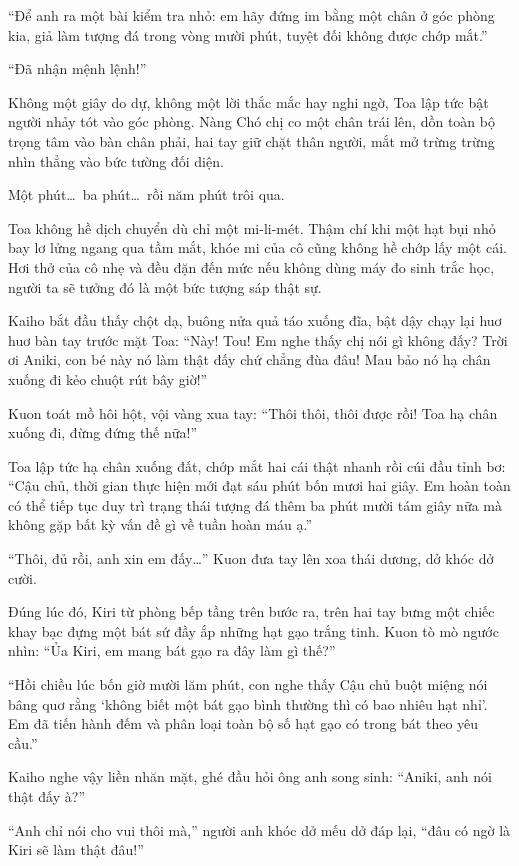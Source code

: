 \documentclass[../main.tex]{subfiles}
\begin{document}
``Để anh ra một bài kiểm tra nhỏ: em hãy đứng im bằng một chân ở góc phòng kia, giả làm tượng đá trong vòng mười phút, tuyệt đối không được chớp mắt.''

``Đã nhận mệnh lệnh!''

Không một giây do dự, không một lời thắc mắc hay nghi ngờ, Toa lập tức bật người nhảy tót vào góc phòng. Nàng Chó chị co một chân trái lên, dồn toàn bộ trọng tâm vào bàn chân phải, hai tay giữ chặt thân người, mắt mở trừng trừng nhìn thẳng vào bức tường đối diện.

Một phút\dots\ ba phút\dots\ rồi năm phút trôi qua.

Toa không hề dịch chuyển dù chỉ một mi-li-mét. Thậm chí khi một hạt bụi nhỏ bay lơ lửng ngang qua tầm mắt, khóe mi của cô cũng không hề chớp lấy một cái. Hơi thở của cô nhẹ và đều đặn đến mức nếu không dùng máy đo sinh trắc học, người ta sẽ tưởng đó là một bức tượng sáp thật sự.

Kaiho bắt đầu thấy chột dạ, buông nửa quả táo xuống đĩa, bật dậy chạy lại huơ huơ bàn tay trước mặt Toa: ``Này! Tou! Em nghe thấy chị nói gì không đấy? Trời ơi Aniki, con bé này nó làm thật đấy chứ chẳng đùa đâu! Mau bảo nó hạ chân xuống đi kẻo chuột rút bây giờ!''

Kuon toát mồ hôi hột, vội vàng xua tay: ``Thôi thôi, thôi được rồi! Toa hạ chân xuống đi, đừng đứng thế nữa!''

Toa lập tức hạ chân xuống đất, chớp mắt hai cái thật nhanh rồi cúi đầu tỉnh bơ: ``Cậu chủ, thời gian thực hiện mới đạt sáu phút bốn mươi hai giây. Em hoàn toàn có thể tiếp tục duy trì trạng thái tượng đá thêm ba phút mười tám giây nữa mà không gặp bất kỳ vấn đề gì về tuần hoàn máu ạ.''

``Thôi, đủ rồi, anh xin em đấy\dots'' Kuon đưa tay lên xoa thái dương, dở khóc dở cười.

Đúng lúc đó, Kiri từ phòng bếp tầng trên bước ra, trên hai tay bưng một chiếc khay bạc đựng một bát sứ đầy ắp những hạt gạo trắng tinh. Kuon tò mò ngước nhìn: ``Ủa Kiri, em mang bát gạo ra đây làm gì thế?''

``Hồi chiều lúc bốn giờ mười lăm phút, con nghe thấy Cậu chủ buột miệng nói bâng quơ rằng `không biết một bát gạo bình thường thì có bao nhiêu hạt nhỉ'. Em đã tiến hành đếm và phân loại toàn bộ số hạt gạo có trong bát theo yêu cầu.''

Kaiho nghe vậy liền nhăn mặt, ghé đầu hỏi ông anh song sinh: ``Aniki, anh nói thật đấy à?''

``Anh chỉ nói cho vui thôi mà,'' người anh khóc dở mếu dở đáp lại, ``đâu có ngờ là Kiri sẽ làm thật đâu!''
\end{document}
